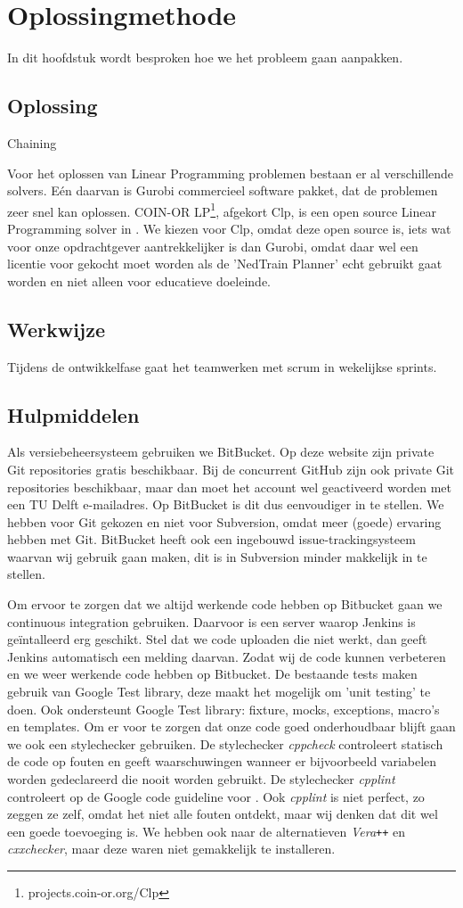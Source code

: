 \section{Oplossingmethode}
In dit hoofdstuk wordt besproken hoe we het probleem gaan aanpakken. 

\subsection{Oplossing}
Chaining

Voor het oplossen van Linear Programming problemen bestaan er al verschillende solvers. E\'en daarvan is Gurobi commercieel software pakket, dat de problemen zeer snel kan oplossen. COIN-OR LP\footnote{projects.coin-or.org/Clp}, afgekort Clp, is een open source Linear Programming solver in \cpp . We kiezen voor Clp, omdat deze open source is, iets wat voor onze opdrachtgever aantrekkelijker is dan Gurobi, omdat daar wel een licentie voor gekocht moet worden als de 'NedTrain Planner' echt gebruikt gaat worden en niet alleen voor educatieve doeleinde. 

\subsection{Werkwijze}
Tijdens de ontwikkelfase gaat het teamwerken met scrum in wekelijkse sprints. 

\subsection{Hulpmiddelen}
Als versiebeheersysteem gebruiken we BitBucket. Op deze website zijn private Git repositories gratis beschikbaar. Bij de concurrent GitHub zijn ook private Git repositories beschikbaar, maar dan moet het account wel geactiveerd worden met een TU Delft e-mailadres. Op BitBucket is dit dus eenvoudiger in te stellen. We hebben voor Git gekozen en niet voor Subversion, omdat meer (goede) ervaring hebben met Git. BitBucket heeft ook een ingebouwd issue-trackingsysteem waarvan wij gebruik gaan maken, dit is in Subversion minder makkelijk in te stellen.

Om ervoor te zorgen dat we altijd werkende code hebben op Bitbucket gaan we continuous integration gebruiken. Daarvoor is een server waarop Jenkins is ge\"intalleerd erg geschikt. Stel dat we code uploaden die niet werkt, dan geeft Jenkins automatisch een melding daarvan. Zodat wij de code kunnen verbeteren en we weer werkende code hebben op Bitbucket. De bestaande tests maken gebruik van Google Test library, deze maakt het mogelijk om 'unit testing' te doen. Ook ondersteunt Google Test library: fixture, mocks, exceptions, macro's en templates. Om er voor te zorgen dat onze code goed onderhoudbaar blijft gaan we ook een stylechecker gebruiken. De stylechecker \emph{cppcheck} controleert statisch de code op fouten en geeft waarschuwingen wanneer er bijvoorbeeld variabelen worden gedeclareerd die nooit worden gebruikt. De stylechecker \emph{cpplint} controleert op de Google code guideline voor \cpp. Ook \emph{cpplint} is niet perfect, zo zeggen ze zelf, omdat het niet alle fouten ontdekt, maar wij denken dat dit wel een goede toevoeging is. We hebben ook naar de alternatieven \emph{Vera\texttt{++}} en \emph{cxxchecker}, maar deze waren niet gemakkelijk te installeren.
